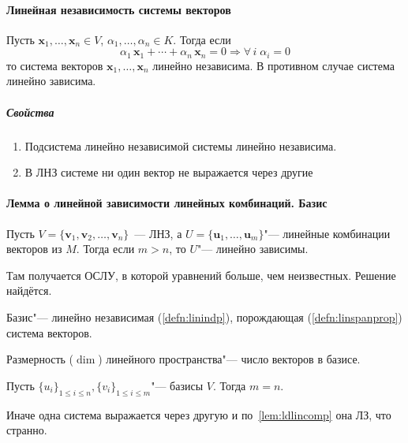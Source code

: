 \documentclass[12pt]{../../notes}
\begin{document}
\paragraph{Линейная независимость системы векторов}

\begin{defn}\label{defn:linindp} Пусть $\mathbf{x}_1,\dotsc, \mathbf{x}_n \in V$, 
$\alpha_1, \dotsc, \alpha_n \in K$.
Тогда если 
\[
  \alpha_1\,\mathbf{x}_1 + \dotsb + \alpha_n\,\mathbf{x}_n = 0 \Rightarrow \forall\,i\;\alpha_i = 0
\]
то система векторов $\mathbf{x}_1, \dotsc, \mathbf{x}_n$ линейно независима.
В противном случае система линейно зависима.
\end{defn}

\subparagraph{Свойства}
\begin{enumerate}
  \item Подсистема линейно независимой системы линейно независима.
  \item В ЛНЗ системе ни один вектор не выражается через другие
\end{enumerate}

\paragraph{Лемма о линейной зависимости линейных комбинаций. Базис}
\begin{lem}\label{lem:ldlincomp} 
  Пусть $V = \{\mathbf{v}_1, \mathbf{v}_2,\dotsc, \mathbf{v}_n\}$~--- ЛНЗ, а 
  $U = \{\mathbf{u}_1, \dotsc , \mathbf{u}_m\}$"--- линейные комбинации векторов из $M$.
  Тогда если $m > n$, то $U$"--- линейно зависимы.  
\end{lem}

\begin{itlproof} 
  Там получается ОСЛУ, в которой уравнений больше, чем неизвестных.  Решение найдётся.
\end{itlproof}

\begin{defn}\label{defn:basis}
  Базис"--- линейно независимая (\ref{defn:linindp}), порождающая (\ref{defn:linspanprop})
  система векторов.
\end{defn}

\begin{defn}\label{defn:lindim}
  Размерность ($\dim$) линейного пространства"--- число векторов в базисе.
\end{defn}

\begin{lem}\label{lem:lindimcorr}
  Пусть $\{u_i\}_{1 \leqslant i \leqslant n}, \{v_i\}_{1 \leqslant i \leqslant m}$"--- базисы
  $V$. Тогда $m=n$.
\end{lem}
\begin{itlproof}
  Иначе одна система выражается через другую и по~\ref{lem:ldlincomp} она ЛЗ, что странно.
\end{itlproof}
\end{document}
